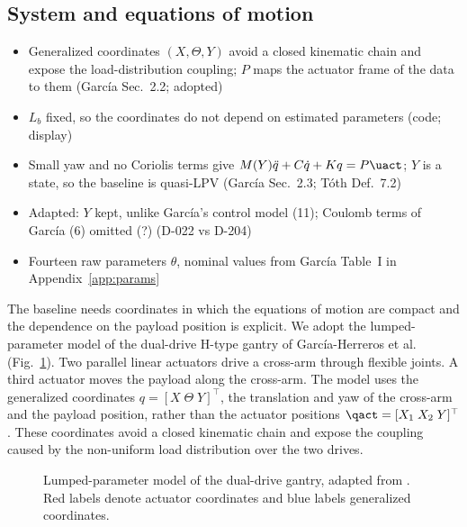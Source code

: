 \subsection{System and equations of motion}\label{sec:sys}
\ifdraft
\begin{itemize}
\item Generalized coordinates $(X,\Theta,Y)$ avoid a closed kinematic chain and expose the load-distribution coupling; $P$ maps the actuator frame of the data to them (Garc\'ia Sec.~2.2; adopted)
\item $L_b$ fixed, so the coordinates do not depend on estimated parameters (code; display)
\item Small yaw and no Coriolis terms give $M(Y)\ddot q+C\dot q+Kq=P\uact$; $Y$ is a state, so the baseline is quasi-LPV (Garc\'ia Sec.~2.3; T\'oth Def.~7.2)
\item Adapted: $Y$ kept, unlike Garc\'ia's control model (11); Coulomb terms of Garc\'ia (6) omitted (?) (D-022 vs D-204)
\item Fourteen raw parameters $\theta$, nominal values from Garc\'ia Table~I in Appendix~\ref{app:params}
\end{itemize}
\fi

The baseline needs coordinates in which the equations of motion are compact
and the dependence on the payload position is explicit.
We adopt the lumped-parameter model of the dual-drive H-type gantry of
Garc\'ia-Herreros et al.~\cite[Sec.~2.2]{garcia2013model}
(Fig.~\ref{fig:gantry_system}).
Two parallel linear actuators drive a cross-arm through flexible joints.
A third actuator moves the payload along the cross-arm.
The model uses the generalized coordinates $q=[X\;\Theta\;Y]^\top$, the
translation and yaw of the cross-arm and the payload position, rather than
the actuator positions $\qact=[X_1\;X_2\;Y]^\top$.
These coordinates avoid a closed kinematic chain and expose the coupling
caused by the non-uniform load distribution over the two drives.

\begin{figure}[b]
  \centering
  \def\gantryabsorber{0}%
  
  \caption{Lumped-parameter model of the dual-drive gantry, adapted from
  \cite{garcia2013model}. Red labels denote actuator coordinates and blue
  labels generalized coordinates.}
  \label{fig:gantry_system}
\end{figure}

